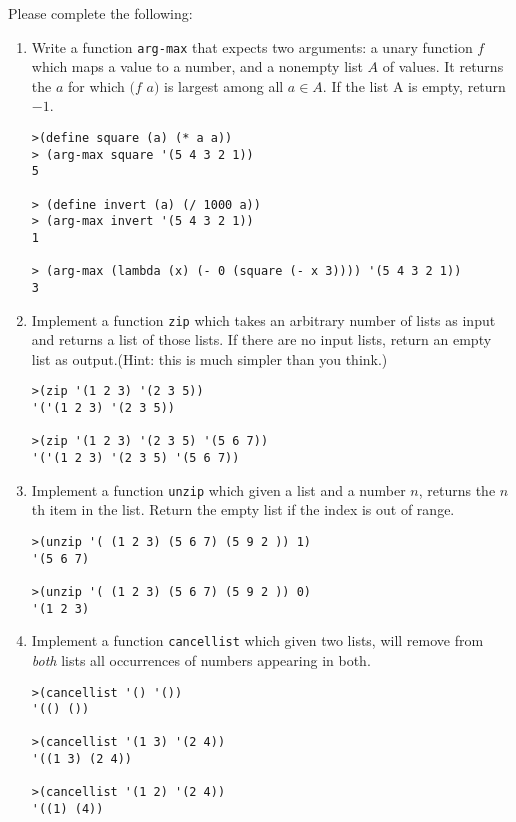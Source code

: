 \documentclass{exam}
\begin{document}
\begin{questions}
Please complete the following:

\begin{enumerate}

\item Write a function \verb|arg-max| that expects two arguments: a unary function $f$ which maps a value to a number, and a nonempty list $A$ of 
values. It returns the $a$ for which $(f$ $a)$ is largest among all $a \in A$. If the list A is empty, return $-1$.

\begin{verbatim}
>(define square (a) (* a a))
> (arg-max square '(5 4 3 2 1))
5

> (define invert (a) (/ 1000 a))
> (arg-max invert '(5 4 3 2 1))
1

> (arg-max (lambda (x) (- 0 (square (- x 3)))) '(5 4 3 2 1))
3
\end{verbatim}

\item Implement a function {\tt zip} which takes an arbitrary number of lists as input and returns a list of those lists. If there are no input lists, return an empty list as output.(Hint: this is much simpler than you think.) 

\begin{verbatim}
>(zip '(1 2 3) '(2 3 5))
'('(1 2 3) '(2 3 5))

>(zip '(1 2 3) '(2 3 5) '(5 6 7))
'('(1 2 3) '(2 3 5) '(5 6 7))
\end{verbatim}

\item Implement a function {\tt unzip} which given a list and a number $n$, returns the $n$th item in the list. Return the empty list if
the index is out of range.

\begin{verbatim}
>(unzip '( (1 2 3) (5 6 7) (5 9 2 )) 1)
'(5 6 7)

>(unzip '( (1 2 3) (5 6 7) (5 9 2 )) 0)
'(1 2 3)
\end{verbatim}

\item  Implement a function {\tt cancellist} which given two lists, will remove from \emph{both} lists all occurrences of numbers appearing in both.

\begin{verbatim}
>(cancellist '() '())
'(() ())

>(cancellist '(1 3) '(2 4))
'((1 3) (2 4))

>(cancellist '(1 2) '(2 4))
'((1) (4))


\end{verbatim}
\end{enumerate}
\end{questions}
\end{document}

